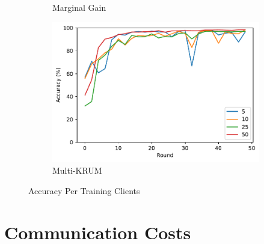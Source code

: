 \begin{figure}[!ht]
\begin{subfigure}[b]{0.49\textwidth}
        \caption{Marginal Gain}
    \end{subfigure}
    \hfill
    \begin{subfigure}[b]{0.49\textwidth}
        \centering
        \includegraphics[width=\textwidth]{graphics/clients/accuracy_multikrum.pdf}
        \caption{Multi-KRUM}
    \end{subfigure}
    \caption{Accuracy Per Training Clients}
    \label{fig:clients_accuracy}
\end{figure}

\section{Communication Costs}

